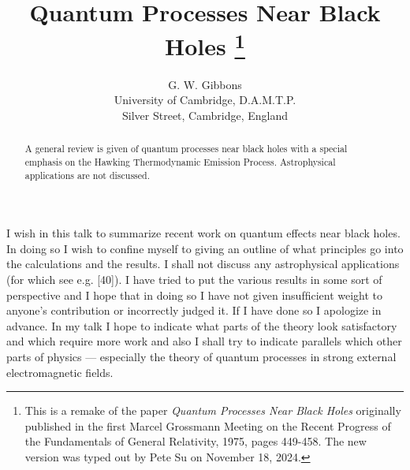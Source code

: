 \usepackage[papersize={6.6in, 10.0in}, left=.5in, right=.5in, top=.6in, bottom=.9in]{geometry}
\linespread{1.05}
\raggedbottom
\pagestyle{plain}
\usepackage{mathpartir}
\usepackage{stmaryrd}
\usepackage{mathtools}
\usepackage{tikz-cd}
\usepackage{microtype}





\usepackage[small]{titlesec}
\usepackage{cite}
\usepackage{upgreek}

\def\Phi{\Upphi}

\title{\large Quantum Processes Near Black Holes%
\footnote{
This is a remake of the paper {\it Quantum Processes Near Black Holes} originally published in the first
Marcel Grossmann Meeting on the Recent Progress of the Fundamentals of General Relativity, 1975, pages 449-458.
The new version was typed out by Pete Su on November 18, 2024.
}}

\author{\normalsize G. W. Gibbons\\
\normalsize University of Cambridge, D.A.M.T.P.\\
\normalsize Silver Street, Cambridge, England}

\date{}

\def\ni{\noindent}
\def\be{\begin{equation}}
\def\ee{\end{equation}}
\def\dt{\mathop{dt}}
\def\dphi{\mathop{d\phi}}
\def\gtt{g_{tt}}




\maketitle
\thispagestyle{empty}

\begin{abstract}
A general review is given of quantum processes near black holes with
a special emphasis on the Hawking Thermodynamic Emission Process. Astrophysical
applications are not discussed.
\end{abstract}

\bigskip

\ni
I wish in this talk to summarize recent work on quantum effects near
black holes. In doing so I wish to conﬁne myself to giving an outline of what
principles go into the calculations and the results. I shall not discuss any
astrophysical applications
(for which see e.g. [40]). I have tried to put the
various results in some sort of perspective and I hope that in doing so I have not given
insufﬁcient weight to anyone's contribution or incorrectly judged it.
If I have done so I apologize in advance. In my talk I hope to indicate what parts of the
theory look satisfactory and which require more work and also I
shall try to indicate parallels which other parts of physics --- especially
the theory of quantum processes in strong external electromagnetic fields.

